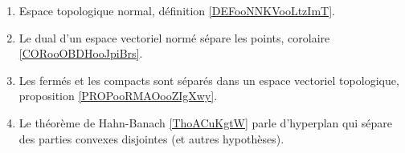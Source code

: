 \begin{enumerate}
	\item
	      Espace topologique normal, définition \ref{DEFooNNKVooLtzImT}.
	\item
	      Le dual d'un espace vectoriel normé sépare les points, corolaire \ref{CORooOBDHooJpiBrs}.
	\item
	      Les fermés et les compacts sont séparés dans un espace vectoriel topologique, proposition \ref{PROPooRMAOooZIgXwy}.
	\item
	      Le théorème de Hahn-Banach \ref{ThoACuKgtW} parle d'hyperplan qui sépare des parties convexes disjointes (et autres hypothèses).
\end{enumerate}
